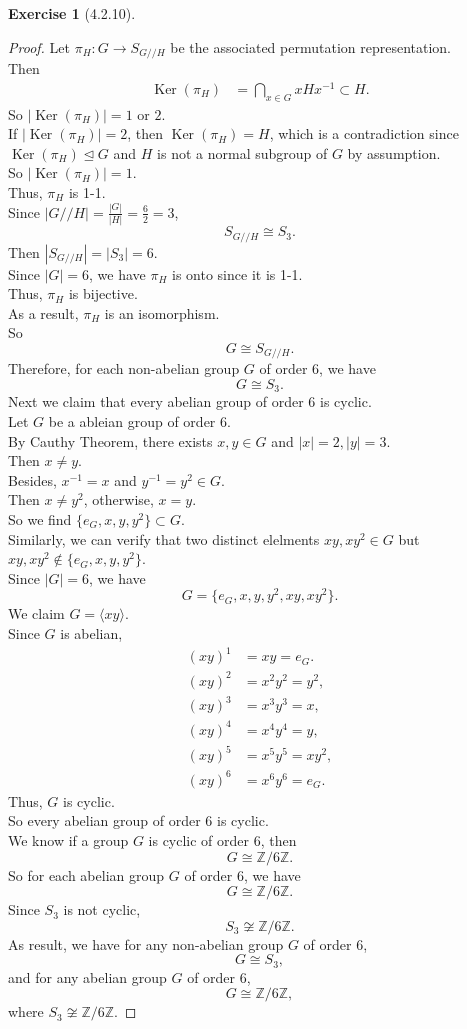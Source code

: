 \documentclass{amsart}
\newcommand{\bbz}{\mathbb{Z}}
\renewcommand{\ker}{\operatorname{Ker}}
\theoremstyle{plain}
\theoremstyle{definition}
\newtheorem{exer}[lem]{Exercise}
\begin{document}
\begin{exer}[4.2.10]
\begin{proof}
Let $\pi_H: G \to S_{G//H}$ be the associated permutation representation.\\
Then
\begin{align*}
	\ker(\pi_H) &= \bigcap_{x\in G}xHx^{-1} \subset  H.
\end{align*}
So $|\ker(\pi_H)| = 1$ or $2$.\\
If $|\ker(\pi_H)| =2$, then $\ker(\pi_H) = H$, which is a contradiction since $\ker(\pi_H) \unlhd G$ and $H$ is not a normal subgroup of $G$ by assumption.\\
So $|\ker(\pi_H)| = 1$.\\
Thus, $\pi_H$ is 1-1.\\
Since $\left|G//H\right| = \frac{|G|}{|H|} = \frac{6}{2} = 3$,\\
\[ S_{G//H} \cong S_3. \]
Then $|S_{G//H}| = |S_3| = 6$.\\
Since $|G| = 6$, we have $\pi_H$ is onto since it is 1-1.\\
Thus, $\pi_H$ is bijective.\\
As a result, $\pi_H$ is an isomorphism.\\
So 
\[G \cong S_{G//H}.\]
Therefore, for each non-abelian group $G$ of order 6, we have
\[G \cong S_3. \]
Next we claim that every abelian group of order 6 is cyclic.\\
Let $G$ be a ableian group of order 6.\\
By Cauthy Theorem, there exists $x,y \in G$ and $|x| = 2, |y|= 3$.\\
Then $x \neq y$.\\
Besides, $x^{-1} = x$ and $y^{-1} = y^2 \in G$.\\
Then $x \neq y^2$, otherwise, $x=y$.\\
So we find $\{e_G,x,y,y^2\} \subset G$.\\
Similarly, we can verify that two distinct elelments $xy,xy^2 \in G$ but $xy,xy^2 \not\in \{e_G,x,y,y^2\}$.\\
Since $|G|=6$, we have
\[ G=\{e_G,x,y,y^2,xy,xy^2\}.\]
We claim $G=\langle xy \rangle$.\\
Since $G$ is abelian,
\begin{align*}
  (xy)^1 &= xy =e_G.\\
  (xy)^2 &=x^2y^2 =y^2,\\
  (xy)^3 &=x^3y^3 = x,\\
  (xy)^4 &=x^4y^4 = y,\\
  (xy)^5 &=x^5y^5 = xy^2,\\
  (xy)^6 &= x^6y^6 = e_G.
\end{align*}
Thus, $G$ is cyclic.\\
So every abelian group of order 6 is cyclic.\\
We know if a group $G$ is cyclic of order 6, then 
\[G \cong \bbz/6\bbz.\]
So for each abelian group $G$ of order 6, we have 
\[ G \cong \bbz/6\bbz.\]
Since $S_3$ is not cyclic,
\[S_3 \not\cong \bbz/6\bbz.\]
As result, we have for any non-abelian group $G$ of order 6, 
\[G \cong S_3, \] 
and for any abelian group $G$ of order 6,
\[G \cong \bbz/6\bbz,\]
where $S_3 \not\cong \bbz/6\bbz$.
\end{proof}
\end{exer}
\end{document}
